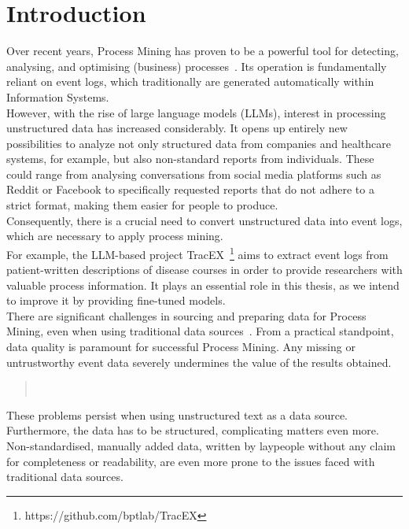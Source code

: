 \section{Introduction}\label{sec:intro}
Over recent years, Process Mining has proven to be a powerful tool for detecting, analysing, and optimising (business) processes~\cite{weske_business_2012}. Its operation is fundamentally reliant on event logs, which traditionally are generated automatically within Information Systems.\\
However, with the rise of large language models (LLMs), interest in processing unstructured data has increased considerably. It opens up entirely new possibilities to analyze not only structured data from companies and healthcare systems, for example, but also non-standard reports from individuals. These could range from analysing conversations from social media platforms such as Reddit or Facebook to specifically requested reports that do not adhere to a strict format, making them easier for people to produce.\\
Consequently, there is a crucial need to convert unstructured data into event logs, which are necessary to apply process mining.
\\
For example, the LLM-based project TracEX~\footnote{https://github.com/bptlab/TracEX} aims to extract event logs from patient-written descriptions of disease courses in order to provide researchers with valuable process information. It plays an essential role in this thesis, as we intend to improve it by providing fine-tuned models.\\
There are significant challenges in sourcing and preparing data for Process Mining, even when using traditional data sources~\cite{van_der_aalst_process_2016}. From a practical standpoint, data quality is paramount for successful Process Mining. Any missing or untrustworthy event data severely undermines the value of the results obtained. 
\begin{quote}
    ~\cite{van_der_aalst_process_2016}    
\end{quote}
These problems persist when using unstructured text as a data source. Furthermore, the data has to be structured, complicating matters even more. Non-standardised, manually added data,  written by laypeople without any claim for completeness or readability, are even more prone to the issues faced with traditional data sources.\\
